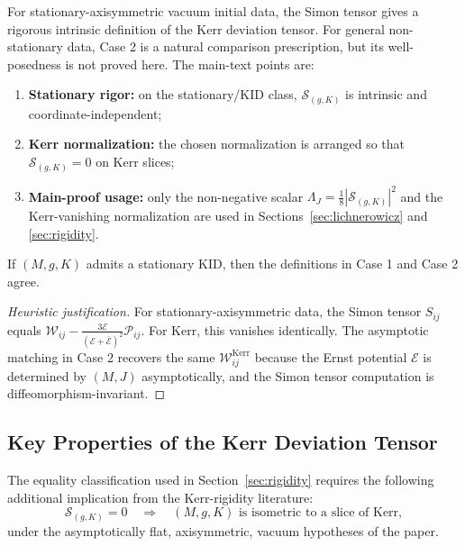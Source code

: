 \begin{remark}\label{rem:well-defined}
For stationary-axisymmetric vacuum initial data, the Simon tensor gives a rigorous intrinsic definition of the Kerr deviation tensor. For general non-stationary data, Case 2 is a natural comparison prescription, but its well-posedness is not proved here. The main-text points are:
\begin{enumerate}
    \item \textbf{Stationary rigor:} on the stationary/KID class, $\mathcal{S}_{(g,K)}$ is intrinsic and coordinate-independent;
    \item \textbf{Kerr normalization:} the chosen normalization is arranged so that $\mathcal{S}_{(g,K)} = 0$ on Kerr slices;
    \item \textbf{Main-proof usage:} only the non-negative scalar $\Lambda_J=\frac18|\mathcal{S}_{(g,K)}|^2$ and the Kerr-vanishing normalization are used in Sections~\ref{sec:lichnerowicz} and \ref{sec:rigidity}.
\end{enumerate}
\end{remark}

\begin{remark}\label{prop:consistency}
If $(M, g, K)$ admits a stationary KID, then the definitions in Case 1 and Case 2 agree.
\end{remark}

\begin{proof}[Heuristic justification]
For stationary-axisymmetric data, the Simon tensor $S_{ij}$ equals $\mathcal{W}_{ij} - \frac{3\mathcal{E}}{(\mathcal{E}+\bar{\mathcal{E}})^2}\mathcal{P}_{ij}$. For Kerr, this vanishes identically. The asymptotic matching in Case 2 recovers the same $\mathcal{W}^{\mathrm{Kerr}}_{ij}$ because the Ernst potential $\mathcal{E}$ is determined by $(M, J)$ asymptotically, and the Simon tensor computation is diffeomorphism-invariant.
\end{proof}

\subsection{Key Properties of the Kerr Deviation Tensor}

\begin{theorem}\label{thm:kerr-characterization}
The equality classification used in Section~\ref{sec:rigidity} requires the following additional implication from the Kerr-rigidity literature:
\[
\mathcal{S}_{(g,K)} = 0 \quad \Longrightarrow \quad (M, g, K) \text{ is isometric to a slice of Kerr},
\]
under the asymptotically flat, axisymmetric, vacuum hypotheses of the paper.
\end{theorem}

